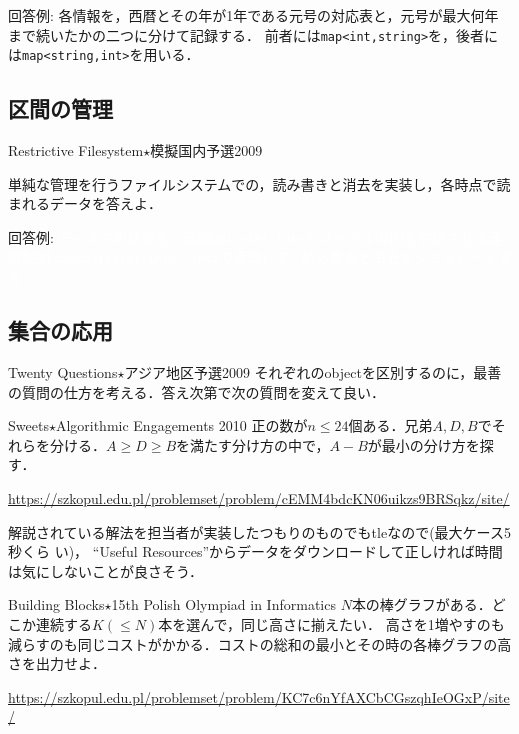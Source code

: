 回答例: 各情報を，西暦とその年が1年である元号の対応表と，元号が最大何年まで続いたかの二つに分けて記録する．
前者には\texttt{map<int,string>}を，後者には\texttt{map<string,int>}を用いる．




\subsection{区間の管理}

\begin{pbox}{Restrictive Filesystem$\star$}{模擬国内予選2009}

単純な管理を行うファイルシステムでの，読み書きと消去を実装し，各時点で読まれるデータを答えよ．

\end{pbox}

回答例: \textcolor{white}{ディスクの状態を，区間\texttt{pair<int,int>}とファイルのIDを対応させる連想配列
\texttt{map<pair<int,int>, int>}で表現して，読み書きと消去をシミュレートする．}

\subsection{集合の応用}

\begin{pbox}{Twenty Questions$\star$}{アジア地区予選2009}
それぞれのobjectを区別するのに，最善の質問の仕方を考える．答え次第で次の質問を変えて良い．

\end{pbox}

\begin{pbox}{Sweets$\star$}{Algorithmic Engagements 2010}
正の数が$n\le24$個ある．兄弟$A,D,B$でそれらを分ける．$A\ge D\ge B$を満たす分け方の中で，$A-B$が最小の分け方を探す．

\url{https://szkopul.edu.pl/problemset/problem/cEMM4bdcKN06uikzs9BRSqkz/site/}
\end{pbox}

解説されている解法を担当者が実装したつもりのものでもtleなので(最大ケース5秒くら
い)， ``Useful Resources''からデータをダウンロードして正しければ時間は気にしないことが良さそう．

\begin{pbox}{Building Blocks$\star$}{15th Polish Olympiad in Informatics}
$N$本の棒グラフがある．どこか連続する$K(\le N)$本を選んで，同じ高さに揃えたい．
高さを1増やすのも減らすのも同じコストがかかる．コストの総和の最小とその時の各棒グラフの高さを出力せよ．

\url{https://szkopul.edu.pl/problemset/problem/KC7c6nYfAXCbCGszqhIeOGxP/site/}
\end{pbox}

